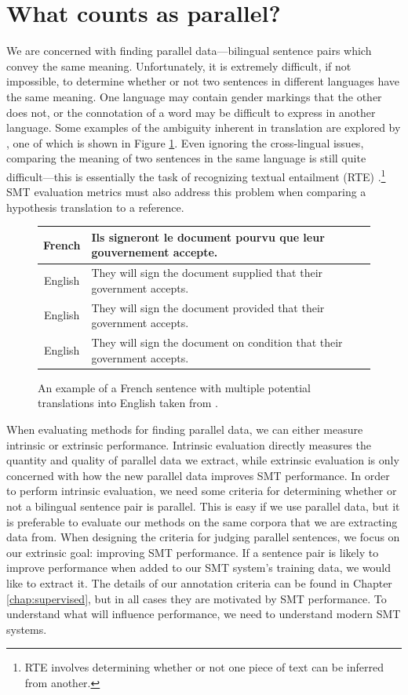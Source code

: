 \section{What counts as parallel?}
\label{sec:what_is_parallel}
We are concerned with finding parallel data---bilingual sentence pairs
which convey the same meaning. Unfortunately, it is extremely difficult, if not
impossible, to determine whether or not two sentences in different languages
have the same meaning. One language may contain gender markings that the other
does not, or the connotation of a word may be difficult to express in another
language. Some examples of the ambiguity inherent in translation are explored by
\citet{Kay97}, one of which is shown in Figure \ref{fig:kay_ambig}.
Even ignoring the cross-lingual issues, comparing the meaning of two sentences
in the same language is still quite difficult---this is essentially the task of recognizing textual
entailment (RTE) \citep{Dagan10}.\footnote{RTE involves determining whether or
not one piece of text can be inferred from another.}
SMT evaluation metrics
\citep{Papineni02,Banerjee05,Snover06} must also address this problem when
comparing a hypothesis translation to a reference.

\begin{figure}[ht]
\begin{tabular}{|c|l|}
\hline
French & Ils signeront le document pourvu que leur gouvernement accepte.\\
\hline
English & They will sign the document supplied that their government accepts. \\
English & They will sign the document provided that their government accepts. \\
English & They will sign the document on condition that their government accepts.\\
\hline
\end{tabular}
\caption{An example of a French sentence with multiple potential translations
into English taken from \citet{Kay97}.}
\label{fig:kay_ambig}
\end{figure}

When evaluating methods for finding parallel data, we can either measure
intrinsic or extrinsic performance. Intrinsic evaluation directly measures the
quantity and quality of parallel data we extract, while extrinsic evaluation is
only concerned with how the new parallel data improves SMT performance.
In order to perform intrinsic evaluation, we need some criteria for determining whether or not a bilingual
sentence pair is parallel. This is easy if we use parallel data, but
it is preferable to evaluate our methods on the same corpora that we are
extracting data from. When designing the criteria for judging parallel
sentences, we focus on our extrinsic goal: improving SMT performance. If a sentence pair
is likely to improve performance when added to our SMT system's training data,
we would like to extract it. The details of our annotation criteria can be found
in Chapter \ref{chap:supervised}, but in all cases they are motivated by SMT
performance. To understand what will influence performance, we need to
understand modern SMT systems.

